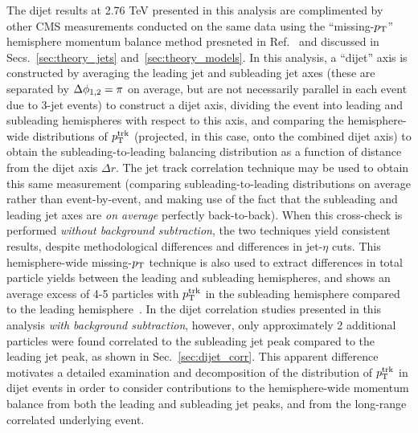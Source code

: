 The dijet results at 2.76 TeV presented in this analysis are complimented by other CMS measurements conducted on the same data using the ``missing-$p_{\rm T}$'' hemisphere momentum balance method presneted in Ref.~\cite{HIN_2014_010} and discussed in Secs.~\ref{sec:theory_jets} and~\ref{sec:theory_models}.  In this analysis, a ``dijet'' axis is constructed by averaging the leading jet and subleading jet axes (these are separated by $\Delta\phi_{\rm 1,2} = \pi$ on average, but are not necessarily parallel in each event due to 3-jet events) to construct a dijet axis, dividing the event into leading and subleading hemispheres with respect to this axis, and comparing the hemisphere-wide distributions of $p_{\rm T}^{\rm trk}$ (projected, in this case, onto the combined dijet axis) to obtain the subleading-to-leading balancing distribution as a function of distance from the dijet axis $\Delta r$.  The jet track correlation technique may be used to obtain this same measurement (comparing subleading-to-leading distributions on average rather than event-by-event, and making use of the fact that the subleading and leading jet axes are \textit{on average} perfectly back-to-back).  When this cross-check is performed \textit{without background subtraction}, the two techniques yield consistent results, despite methodological differences and differences in jet-$\eta$ cuts.  This hemisphere-wide missing-$p_{\rm T}$ technique is also used to extract differences in total particle yields between the leading and subleading hemispheres, and shows an average excess of 4-5 particles with $p_{\rm T}^{\rm trk}$ in the subleading hemisphere compared to the leading hemisphere~\cite{HIN_2014_010}.  In the dijet correlation studies presented in this analysis \textit{with background subtraction}, however, only approximately 2 additional particles were found correlated to the subleading jet peak compared to the leading jet peak, as shown in Sec.~\ref{sec:dijet_corr}.  This apparent difference motivates a detailed examination and decomposition of the distribution of $p_{\rm T}^{\rm trk}$ in dijet events in order to consider contributions to the hemisphere-wide momentum balance from both the leading and subleading jet peaks, and from the long-range correlated underlying event.  

